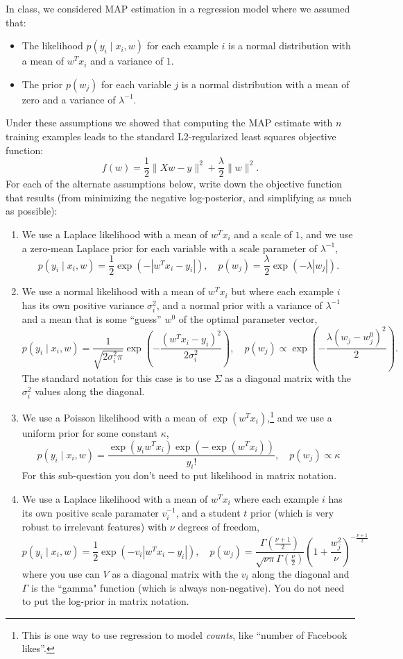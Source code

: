 \documentclass{article}
\def\blu#1{{\color{blu}#1}}
\def\norm#1{\|#1\|}
\def\cond{\; | \;}
\def\items#1{\begin{itemize}#1\end{itemize}}
\def\enum#1{\begin{enumerate}#1\end{enumerate}}
\begin{document}
In class, we considered MAP estimation in a regression model where we assumed that:
\items{
\item The likelihood $p(y_i \cond x_i, w)$ for each example $i$ is a normal distribution with a mean of $w^Tx_i$ and a variance of $1$.
\item The prior $p(w_j)$ for each variable $j$ is a normal distribution with a mean of zero and a variance of $\lambda^{-1}$.
}
Under these assumptions we showed that computing the MAP estimate with $n$ training examples leads to the standard L2-regularized least squares objective function:
\[
f(w) = \frac{1}{2}\norm{Xw - y}^2 + \frac \lambda 2 \norm{w}^2.
\]
\blu{For each of the alternate assumptions below, write down the objective function that results} (from minimizing the negative log-posterior, and simplifying as much as possible):
\enum{
\item  We use a Laplace likelihood with a mean of $w^Tx_i$ and a scale of $1$, and we use a zero-mean Laplace prior for each variable with a scale parameter of $\lambda^{-1}$,
\[
p(y_i \cond x_i, w) = \frac 1 2 \exp(-|w^Tx_i - y_i|), \quad  p(w_j) = \frac{\lambda}{2}\exp(-\lambda|w_j|).
\]
\item We use a normal  likelihood with a mean of $w^Tx_i$ but where each example $i$ has its own  positive variance $\sigma_i^2$, and a normal prior with a variance of $\lambda^{-1}$ and a mean that is some ``guess'' $w^0$ of the optimal parameter vector,
\[
p(y_i \cond x_i,w) = \frac{1}{\sqrt{2\sigma_i^2\pi}}\exp\left(-\frac{(w^Tx_i - y_i)^2}{2\sigma_i^2}\right), \quad p(w_j) \propto \exp\left(-\frac{\lambda(w_j -  w^0_j)^2}{2}\right).
\]
The standard notation for this case is to use $\Sigma$ as a diagonal matrix with the $\sigma_i^2$ values along the diagonal.
\item We use a Poisson likelihood with a mean of $\exp(w^Tx_i)$,\footnote{This is one way to use regression to model \emph{counts}, like ``number of Facebook likes''.} and we use a uniform prior for some constant $\kappa$,
\[
p(y_i \cond x_i, w) = \frac{\exp(y_iw^Tx_i)\exp(-\exp(w^Tx_i))}{y_i!}, \quad p(w_j) \propto \kappa
\]
For this sub-question you don't need to put likelihood in matrix notation.
\item We use a Laplace likelihood with a mean of $w^Tx_i$ where each example $i$ has its own positive scale paramater $v_i^{-1}$, and a  student $t$ prior (which is very robust to irrelevant features) with $\nu$ degrees of freedom,
\[
p(y_i \cond x_i, w) = \frac 1 2 \exp\left(-v_i|w^Tx_i - y_i|\right), \quad  p(w_j) = \frac{\Gamma\left(\frac{\nu + 1}{2}\right)}{\sqrt{\nu\pi}\Gamma\left(\frac \nu 2\right)}\left(1 + \frac{w_j^2}{\nu}\right)^{-\frac{\nu+1}{2}}
\]
where you use can $V$ as a diagonal matrix with the $v_i$ along the diagonal and $\Gamma$ is the ``gamma" function (which is always non-negative). You do not need to put the log-prior in matrix notation.
}
\end{document}
